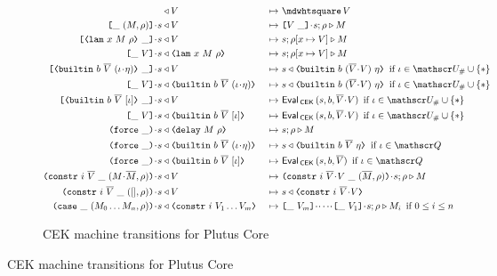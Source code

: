 \begin{figure}[H]
\begin{subfigure}[c]{\linewidth}
\begin{minipage}{\linewidth}
\begin{alignat*}{2}
[] & \return V                                    &~\mapsto~& \cekhalt{V}\\
\inAppLeftFrame{(M,\rho)}  \cons s            & \return V  &~\mapsto~& \inAppRightFrame{V} \cons s;\rho \compute M\\
\inAppRightFrame{\VLamAbs{x}{M}{\rho}} \cons s   & \return V  &~\mapsto~& s;\rho[x \mapsto V] \compute M\\
\inAppLeftFrame{V} \cons s   & \return \VLamAbs{x}{M}{\rho}  &~\mapsto~& s;\rho[x \mapsto V] \compute M\\
\inAppRightFrame{\VBuiltin{b}{\repetition{V}}{(\iota \cons \eta)}} \cons s & \return V &~\mapsto~&
                         s \return \VBuiltin{b}{(\repetition{V} \snoc V)}{\eta} \enskip \text{if $\iota \in \Unihash \cup \VarStar$}\\
\inAppLeftFrame{V} \cons s & \return \VBuiltin{b}{\repetition{V}}{(\iota \cons \eta)} &~\mapsto~&
                         s \return \VBuiltin{b}{(\repetition{V} \snoc V)}{\eta} \enskip \text{if $\iota \in \Unihash \cup \VarStar$}\\
\inAppRightFrame{\VBuiltin{b}{\repetition{V}}{[\iota]}} \cons s  & \return V &~\mapsto~&
                         \EvalCEK\,(s, b, \repetition{V}\snoc V) \enskip \text{if $\iota \in \Unihash \cup \VarStar$}\\
\inAppLeftFrame{V} \cons s & \return \VBuiltin{b}{\repetition{V}}{[\iota]} &~\mapsto~&
                         \EvalCEK\,(s, b, \repetition{V}\snoc V) \enskip \text{if $\iota \in \Unihash \cup \VarStar$}\\
\inForceFrame{} \cons s & \return \VDelay{M}{\rho}         &~\mapsto~& s;\rho \compute M\\
\inForceFrame{} \cons s & \return \VBuiltin{b}{\repetition{V}}{(\iota \cons \eta)} &~\mapsto~&
                         s \return \VBuiltin{b}{\repetition{V}}{\eta} \enskip \text{if $\iota \in \QVar$}\\
\inForceFrame{} \cons s & \return \VBuiltin{b}{\repetition{V}}{[\iota]}   &~\mapsto~&
                         \EvalCEK\,(s, b, \repetition{V}) \enskip \text{if $\iota \in \QVar$}\\
\inConstrFrame{i}{\repetition{V}}{(M \cons \repetition{M}, \rho)} \cons s & \return V   &~\mapsto~&
                         \inConstrFrame{i}{\repetition{V} \cons V}{(\repetition{M}, \rho)} \cons s;\rho \compute M \\
\inConstrFrame{i}{\repetition{V}}{([], \rho)} \cons s & \return V   &~\mapsto~&
                         s \return \VConstr{i}{\repetition{V} \cons V} \\
\inCaseFrame{(M_0 \ldots M_n, \rho)} \cons s & \return \VConstr{i}{V_1 \ldots V_m}   &~\mapsto~&
                         \inAppLeftFrame{V_m} \cons \cdots \cons \inAppLeftFrame{V_1} \cons s ;\rho \compute M_i \enskip \text{if $0 \leq i \leq n$}
\end{alignat*}
\end{minipage}
    \caption{CEK machine transitions for Plutus Core}
    \label{fig:untyped-cek-transitions}
\end{subfigure}


\end{figure}
